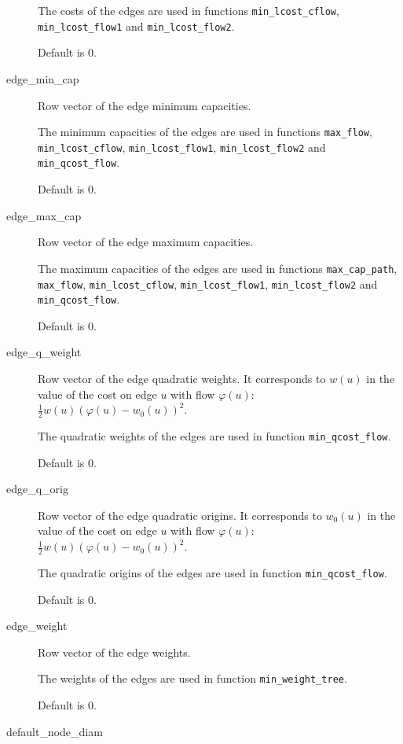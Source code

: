 \documentclass[11pt]{article}
\newcommand{\func}[1]{\texttt{#1}}
\begin{document}
\begin{description}
The costs of the edges are used in functions \func{min\_lcost\_cflow}, 
\func{min\_lcost\_flow1} and \func{min\_lcost\_flow2}.

Default is 0.

  \item[edge\_min\_cap]

Row vector of the edge minimum capacities.

The minimum capacities of the edges are used in functions \func{max\_flow}, 
\func{min\_lcost\_cflow}, 
\func{min\_lcost\_flow1}, \func{min\_lcost\_flow2} and
\func{min\_qcost\_flow}.

Default is 0.

  \item[edge\_max\_cap]

Row vector of the edge maximum capacities.

The maximum capacities of the edges are used in functions 
\func{max\_cap\_path}, 
\func{max\_flow}, 
\func{min\_lcost\_cflow}, 
\func{min\_lcost\_flow1}, \func{min\_lcost\_flow2} and
\func{min\_qcost\_flow}.

Default is 0.

  \item[edge\_q\_weight]

Row vector of the edge quadratic weights. It corresponds to $w(u)$ in
the value of the cost on edge $u$ with flow $\varphi(u)$:
$\frac{1}{2}w(u)(\varphi(u)-w_0(u))^2$.

The quadratic weights of the edges are used in function 
\func{min\_qcost\_flow}.

Default is 0.

  \item[edge\_q\_orig]

Row vector of the edge quadratic origins. It corresponds to $w_0(u)$ in
the value of the cost on edge $u$ with flow $\varphi(u)$:
$\frac{1}{2}w(u)(\varphi(u)-w_0(u))^2$.

The quadratic origins of the edges are used in function 
\func{min\_qcost\_flow}.

Default is 0.

  \item[edge\_weight]

Row vector of the edge weights.

The weights of the edges are used in function
\func{min\_weight\_tree}.

Default is 0.

  \item[default\_node\_diam]


\end{description}
\end{document}
